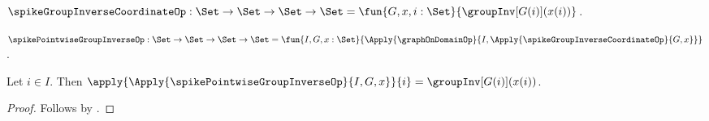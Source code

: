 \begin{definition}\label{spike_group_inverse_coordinate_op}
    $\spikeGroupInverseCoordinateOp:
        \Set\to\Set\to\Set\to\Set
        =\fun{G,x,i:\Set}{\groupInv[G(i)](x(i))}$.
\end{definition}

\begin{definition}\label{spike_pointwise_group_inverse_op}
    $\spikePointwiseGroupInverseOp:
        \Set\to\Set\to\Set\to\Set
        =\fun{I,G,x:\Set}{
            \Apply{\graphOnDomainOp}{
                I,\Apply{\spikeGroupInverseCoordinateOp}{G,x}}}$.
\end{definition}

\begin{proposition}\label{spike_pointwise_group_inverse_coordinate}
    Let $i\in I$.
    Then
        $\apply{\Apply{\spikePointwiseGroupInverseOp}{I,G,x}}{i}
            =\groupInv[G(i)](x(i))$.
\end{proposition}
\begin{proof}
    Follows by
        .
\end{proof}

